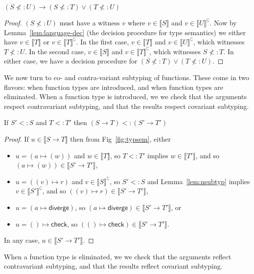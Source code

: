 \documentclass[acmsmall,review,screen]{acmart}
\newcommand{\DIVERGE}{\mathsf{diverge}}
\newcommand{\CHECK}{\mathsf{check}}
\newcommand{\fun}{\mathbin{\rightarrow}}
\newcommand{\sem}[1]{\llbracket{#1}\rrbracket}
\newcommand{\nsem}[1]{\llbracket{#1}\rrbracket^\complement}
\begin{document}
\begin{lemma}
  $(S \not<: U) \fun (S \not<: T) \lor (T \not<: U)$
\end{lemma}
\begin{proof}
  $(S \not<: U)$ must have a witness $v$ where
  $v \in \sem{S}$ and $v \in \nsem{U}$.
  Now by Lemma~\ref{lem:language-dec} (the decision procedure for type semantics)
  we either have $v \in \sem{T}$ or $v \in \nsem{T}$. In the first case,
  $v \in \sem{T}$ and $v \in \nsem{U}$, which witnesses $T \not<: U$.
  In the second case,
  $v \in \sem{S}$ and $v \in \nsem{T}$, which witnesses $S \not<: T$.
  In either case, we have a decision procedure for
  $(S \not<: T) \lor (T \not<: U)$.
\end{proof}

We now turn to co- and contra-variant subtyping of functions.
These come in two flavors: when function types are introduced,
and when function types are eliminated.
When a function type is introduced, we
we check that the arguments respect contravariant subtyping,
and that the results respect covariant subtyping.

\begin{lemma}
  \label{lemma:intro-fun-variant}
  If $S' <: S$ and $T <: T'$
  then $(S \fun T) <: (S' \fun T')$
\end{lemma}
\begin{proof}
  If $u \in \sem{S \fun T}$
  then from Fig~\ref{fig:typsem}, either
  \begin{itemize}
  \item $u = (a \mapsto (w))$ and $w \in \sem{T}$, so $T <: T'$ implies
    $w \in \sem{T'}$, and so $(a \mapsto (w)) \in \sem{S' \fun T'}$,
  \item $u = ((v) \mapsto r)$ and $v \in \nsem{S}$, so $S' <: S$ and Lemma~\ref{lem:nsubtyp} implies
    $v \in \nsem{S'}$, and so $((v) \mapsto r) \in \sem{S' \fun T'}$,
  \item $u = (a \mapsto \DIVERGE)$, so $(a \mapsto \DIVERGE) \in \sem{S' \fun T'}$, or
  \item $u = () \mapsto \CHECK$, so $(() \mapsto \CHECK) \in \sem{S' \fun T'}$.
  \end{itemize}
  In any case, $u \in \sem{S' \fun T'}$.
\end{proof}
  
When a function type is eliminated, we
we check that the arguments reflect contravariant subtyping,
and that the results reflect covariant subtyping.
\end{document}
